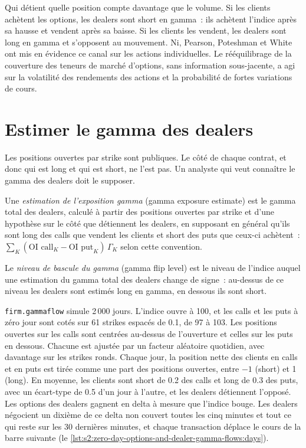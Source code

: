Qui détient quelle position compte davantage que le volume. Si les clients achètent les options, les dealers sont short en gamma~: ils achètent l'indice après sa hausse et vendent
après sa baisse. Si les clients les vendent, les dealers sont long en gamma et s'opposent au mouvement. Ni, Pearson, Poteshman
et White ont mis en évidence ce canal sur les actions individuelles. Le rééquilibrage de la couverture des teneurs de marché d'options, sans information sous-jacente, a agi sur
la volatilité des rendements des actions et la probabilité de fortes variations de cours.

\section{Estimer le gamma des dealers}

Les positions ouvertes par strike sont publiques. Le côté de chaque contrat, et donc qui est long et qui est short, ne l'est pas. Un analyste qui veut connaître le gamma des dealers doit
le supposer.

\begin{definition}\label{def:s2:zero-day-options-and-dealer-gamma-flows:gex}
Une \emph{estimation de l'exposition gamma} (gamma exposure estimate) est le gamma total des dealers, calculé à partir des positions ouvertes par strike et d'une hypothèse
sur le côté que détiennent les dealers, en supposant en général qu'ils sont long des calls que vendent les clients et short des puts que ceux-ci achètent~: $\sum_K (\text{OI call}_K -
\text{OI put}_K)\,\Gamma_K$ selon cette convention.
\end{definition}

\begin{definition}\label{def:s2:zero-day-options-and-dealer-gamma-flows:flip}
Le \emph{niveau de bascule du gamma} (gamma flip level) est le niveau de l'indice auquel une estimation du gamma total des dealers change de signe~: au-dessus de ce niveau
les dealers sont estimés long en gamma, en dessous ils sont short.
\end{definition}

\texttt{firm.gammaflow} simule 2\,000 jours. L'indice ouvre à 100, et les calls et les puts à zéro jour sont cotés sur 61 strikes espacés de 0.1, de 97 à 103.
Les positions ouvertes sur les calls sont centrées au-dessus de l'ouverture et celles sur les puts en dessous. Chacune est ajustée par un facteur aléatoire quotidien, avec davantage sur les strikes ronds. Chaque
jour, la position nette des clients en calls et en puts est tirée comme une part des positions ouvertes, entre $-1$ (short) et 1 (long). En moyenne, les clients
sont short de 0.2 des calls et long de 0.3 des puts, avec un écart-type de 0.5 d'un jour à l'autre, et les dealers détiennent l'opposé. Les
options des dealers gagnent en delta à mesure que l'indice bouge. Les dealers négocient un dixième de ce delta non couvert toutes les cinq minutes et tout ce qui reste sur les 30 dernières minutes,
et chaque transaction déplace le cours de la barre suivante (le \cref{lst:s2:zero-day-options-and-dealer-gamma-flows:days}).

